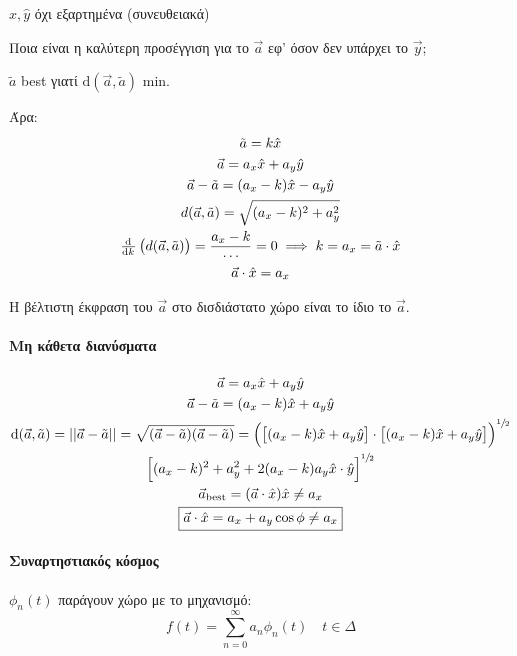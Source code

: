     \( \hat x,\hat y \) όχι εξαρτημένα (συνευθειακά)
    
    Ποια είναι η καλύτερη προσέγγιση για το \(\vec a\) εφ' όσον δεν υπάρχει
    το \( \vec y \);
    
    \( \tilde a \) best γιατί \(\mathrm d(\vec a,\tilde a)\) min.
    
    Άρα:
    \begin{gather*}
        \tilde a = k\hat x \\
        \vec a = a_x\hat x+a_y\hat y\\
        \vec a -\tilde a = (a_x-k)\hat x - a_y\hat y\\
        d(\vec a,\tilde a) = \sqrt{(a_x-k)^2+a_y^2} \\
        \od{}{k}\left( d(\vec a,\tilde a) \right) = \frac{a_x-k}{\cdots}
        = 0 \implies k=a_x = \tilde a \cdot \hat x\\
        \vec a\cdot\hat x = a_x
    \end{gather*}
    
    Η βέλτιστη έκφραση του \( \vec a \) στο δισδιάστατο χώρο είναι το ίδιο το \( \vec a \).
    
    \paragraph{Μη κάθετα διανύσματα}
    
    
    \begin{gather*}
    \vec a = a_x\hat x+a_y\hat y\\
    \vec a - \tilde a = (a_x-k)\hat x+a_y\hat y\\
    \mathrm d(\vec a,\tilde a)= ||\vec a - \tilde a|| = \sqrt{(\vec a-\tilde a)(\vec a-\tilde a)}
    =\left(
    \left[ (a_x-k)\hat x+a_y\hat y \right]\cdot
    \left[ (a_x-k)\hat x+a_y\hat y \right]
    \right)^{\sfrac{1}{2}}\\
    \left[
    (a_x-k)^2+a_y^2+2(a_x-k)a_y\hat x\cdot\hat y
    \right]^{\sfrac{1}{2}} \\
    \vec a_{\mathrm{best}} = (\vec a \cdot \hat x)\hat x \neq a_x \\
    \boxed{\vec a \cdot \hat x = a_x+a_y\cos\phi\neq a_x}
    \end{gather*}
    


    \paragraph{Συναρτηστιακός κόσμος}
    \( \phi_n(t) \) παράγουν χώρο με το μηχανισμό:
    \[
    f(t)=\sum_{n=0}^\infty a_n\phi_n(t)\quad t \in \Delta
    \]
    
